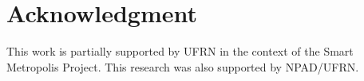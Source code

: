 \documentclass[conference,letterpaper,retainorgcmds]{IEEEtran}
\begin{document}







\section*{Acknowledgment}
This work is partially supported by UFRN in the context of the Smart Metropolis Project. This research was also supported by NPAD/UFRN.


% 
% 


\appendices
\end{document}
